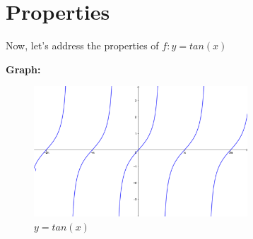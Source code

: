 \documentclass{article}
\begin{document}
\section{Properties}

Now, let's address the properties of $f:y=tan(x)$

\textbf{Graph: }

\begin{figure}[htp]
    \centering
    \includegraphics[width=8cm]{tan.png}
    \caption{$y=tan(x)$}
\end{figure}
\end{document}
